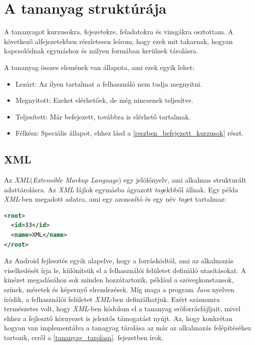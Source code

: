 \documentclass[12pt,a4paper]{article}
\newcommand{\xml}{\textit{XML}\xspace}
\begin{document}
	\section{A tananyag struktúrája}  
	
	A tananyagot kurzusokra, fejezetekre, feladatokra és vizsgákra osztottam. A következő alfejezetekben részletesen leírom, hogy ezek mit takarnak, hogyan kapcsolódnak egymáshoz és milyen formában kerülnek tárolásra.
	
	A tananyag összes elemének van állapota, ami ezek egyik lehet:
	
	\begin{itemize}
		\item Lezárt: Az ilyen tartalmat a felhasználó nem tudja megnyitni. 
		\item Megnyitott: Ezeket elérhetőek, de még nincsenek teljesítve.
		\item Teljesített: Már befejezett, továbbra is elérhető tartalmak.
		\item Félkész: Speciális állapot, ehhez lásd a \ref{reszben_befejezett_kurzusok} részt.
	\end{itemize}
		
	\subsection{XML}
	
	Az \xml (\textit{Extensible Markup Language}) egy jelölőnyelv, ami alkalmas strukturált adattárolásra. Az \xml fájlok egymásba ágyazott \textit{tag}ekbből állnak. Egy példa \xml-ben megadott adatra, ami egy azonosító és egy név \textit{tag}et tartalmaz:
	
	\bigskip
	\begin{lstlisting}[language=XML]
<root>
  <id>33</id>
  <name>XML</name>
</root>
	\end{lstlisting}
	\bigskip
	
	Az Android fejlesztés egyik alapelve, hogy a forráskódtól, ami az alkalmazás viselkedését írja le, különítsük el a felhasználói felületet definiáló utasításokat. A kinézet megadásához sok minden hozzátartozik, például a szövegkonstansok, színek, méretek és képernyő elrendezések. Míg maga a program \textit{Java} nyelven íródik, a felhasználói felületet \xml-ben definiálhatjuk. Ezért számomra természetes volt, hogy \xml-ben kódolom el a tananyag erőforrásfájljait, mivel ehhez a fejlesztő környezet is jelentős támogatást nyújt. Az, hogy konkrétan hogyan van implementálva a tanagyag tárolása az már az alkalmazás felépítéséhez tartozik, erről a \ref{tananyag_tarolasa}. fejezetben írok.
	
\end{document}
